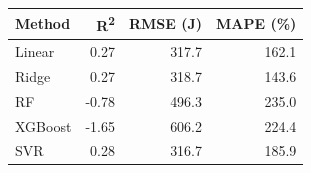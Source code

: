 \begin{tabular}{@{}lrrr@{}}
\toprule
\textbf{Method} & \textbf{R\textsuperscript{2}} & \textbf{RMSE (J)} & \textbf{MAPE (\%)} \\
\midrule
Linear & 0.27 & 317.7 & 162.1 \\
Ridge & 0.27 & 318.7 & 143.6 \\
RF & -0.78 & 496.3 & 235.0 \\
XGBoost & -1.65 & 606.2 & 224.4 \\
SVR & 0.28 & 316.7 & 185.9 \\
\bottomrule
\end{tabular}